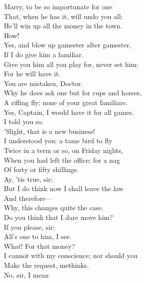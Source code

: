 \documentclass[a4paper,oneside,12pt]{memoir}
\begin{document}
\begin{drama*}
\subtlespeaks Marry, to be so importunate for one\\
That, when he has it, will undo you all:\\
He'll win up all the money in the town.\\
\facespeaks How!\\
\subtlespeaks {} Yes, and blow up gamester after gamester,\\
If I do give him a familiar.\\
Give you him all you play for, never set him:\\
For he will have it.\\
\facespeaks {} You are mistaken, Doctor.\\
Why he does ask one but for cups and horses,\\
A rifling fly; none of your great familiars.\\
\dapperspeaks Yes, Captain, I would have it for all games.\\
\subtlespeaks I told you so.\\
\facespeaks {}  'Slight, that is a new business!\\
I understood you: a tame bird to fly\\
Twice in a term or so, on Friday nights,\\
When you had left the office; for a nag\\
Of forty or fifty shillings.\\
\dapperspeaks {} Ay, 'tis true, sir;\\
But I do think now I shall leave the law\\
And therefore---\\
\facespeaks {} Why, this changes quite the case.\\
Do you think that I dare move him?\\
\dapperspeaks {} If you please, sir;\\
All's one to him, I see.\\
\facespeaks {} What! For that money?\\
I cannot with my conscience; nor should you\\
Make the request, methinks.\\
\dapperspeaks {} No, sir, I mean\\

\end{drama*}
\end{document}
